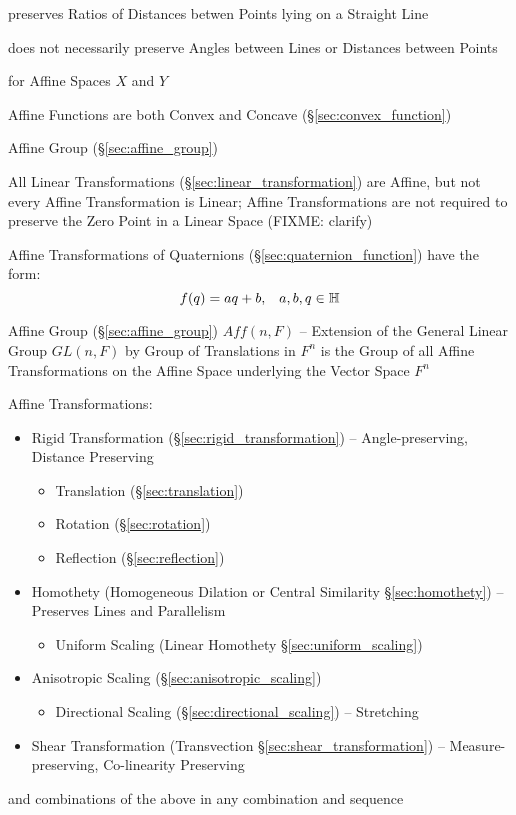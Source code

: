preserves Ratios of Distances betwen Points lying on a Straight Line

does not necessarily preserve Angles between Lines or Distances between Points

for Affine Spaces $X$ and $Y$

Affine Functions are both Convex and Concave (\S\ref{sec:convex_function})

\fist Affine Group (\S\ref{sec:affine_group})

\fist All Linear Transformations (\S\ref{sec:linear_transformation}) are
Affine, but not every Affine Transformation is Linear; Affine Transformations
are not required to preserve the Zero Point in a Linear Space (FIXME: clarify)

Affine Transformations of Quaternions (\S\ref{sec:quaternion_function}) have
the form:
\[
  f(q) = aq + b, \;\;\; a,b,q \in \mathbb{H}
\]

Affine Group (\S\ref{sec:affine_group}) $Aff(n,F)$ -- Extension of the General
Linear Group $GL(n,F)$ by Group of Translations in $F^n$ is the Group of all
Affine Transformations on the Affine Space underlying the Vector Space $F^n$

Affine Transformations:
\begin{itemize}
  \item Rigid Transformation (\S\ref{sec:rigid_transformation}) --
    Angle-preserving, Distance Preserving
    \begin{itemize}
      \item Translation (\S\ref{sec:translation})
      \item Rotation (\S\ref{sec:rotation})
      \item Reflection (\S\ref{sec:reflection})
    \end{itemize}
  \item Homothety (Homogeneous Dilation or Central Similarity
    \S\ref{sec:homothety}) -- Preserves Lines and Parallelism
    \begin{itemize}
      \item Uniform Scaling (Linear Homothety \S\ref{sec:uniform_scaling})
    \end{itemize}
  \item Anisotropic Scaling (\S\ref{sec:anisotropic_scaling})
    \begin{itemize}
      \item Directional Scaling (\S\ref{sec:directional_scaling}) -- Stretching
    \end{itemize}
  \item Shear Transformation (Transvection \S\ref{sec:shear_transformation}) --
    Measure-preserving, Co-linearity Preserving
\end{itemize}
and combinations of the above in any combination and sequence

